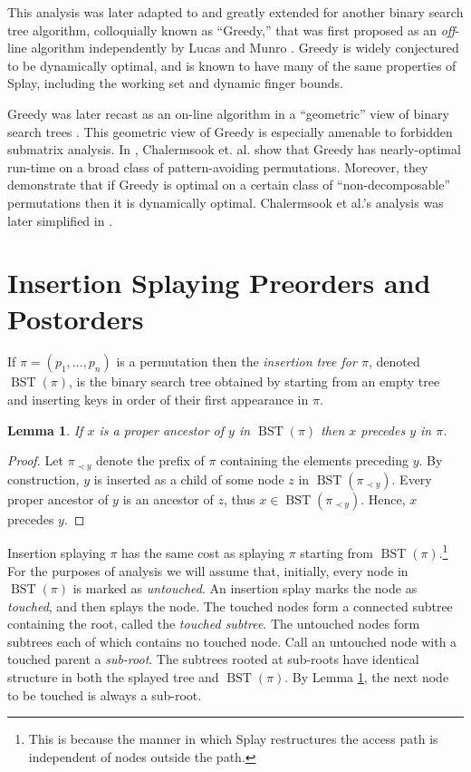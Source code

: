 \documentclass{article}
\theoremstyle{plain}
\newtheorem{lemma}{Lemma}
\theoremstyle{definition}
\DeclareMathOperator{\BST}{BST}  %
\begin{document}
%
This analysis was later adapted to and greatly extended for another binary
search tree algorithm, colloquially known as ``Greedy,'' that was first
proposed as an \emph{off}-line algorithm independently by Lucas
\cite{CANONICAL_FORMS} and Munro \cite{MUNRO_GREEDY}. Greedy is widely
conjectured to be dynamically optimal, and is known to have many of the same
properties of Splay, including the working set \cite{GREEDY_ACCESS_LEMMA} and
dynamic finger \cite{GREEDY_DYNAMIC_FINGER} bounds.

%
Greedy was later recast as an on-line algorithm in a ``geometric'' view of
binary search trees \cite{GEOMETRY}. This geometric view of Greedy is
especially amenable to forbidden submatrix analysis. In
\cite{PATTERN_AVOIDANCE}, Chalermsook et. al. show that Greedy has
nearly-optimal run-time on a broad class of pattern-avoiding permutations.
Moreover, they demonstrate that if Greedy is optimal on a certain class of
``non-decomposable'' permutations then it is dynamically optimal. Chalermsook
et al.'s analysis was later simplified in \cite{SIMPLER_PATTERN_AVOIDANCE}.


\section{Insertion Splaying Preorders and Postorders}\label{sec:MainResults}


%
If $\pi=(p_1,\dots,p_n)$ is a permutation then the \emph{insertion tree for
$\pi$}, denoted $\BST(\pi)$, is the binary search tree obtained by starting
from an empty tree and inserting keys in order of their first appearance in
$\pi$.
%
\begin{lemma}\label{lem:AncestorPrecedence}
If $x$ is a proper ancestor of $y$ in $\BST(\pi)$ then $x$ precedes $y$ in
$\pi$.
\end{lemma}

\begin{proof}
Let $\pi_{\prec y}$ denote the prefix of $\pi$ containing the elements preceding
$y$. By construction, $y$ is inserted as a child of some node $z$ in
$\BST(\pi_{\prec y})$. Every proper ancestor of $y$ is an ancestor of
$z$, thus $x\in\BST(\pi_{\prec y})$. Hence, $x$ precedes $y$.
\end{proof}

%
Insertion splaying $\pi$ has the same cost as splaying $\pi$ starting from
$\BST(\pi)$.\footnote{This is because the manner in which Splay restructures
the access path is independent of nodes outside the path.} For the purposes of
analysis we will assume that, initially, every node in $\BST(\pi)$ is marked as
\emph{untouched}. An insertion splay marks the node as \emph{touched}, and then
splays the node. The touched nodes form a connected subtree containing the
root, called the \emph{touched subtree}. The untouched nodes form subtrees each
of which contains no touched node. Call an untouched node with a touched parent
a \emph{sub-root}. The subtrees rooted at sub-roots have identical structure in
both the splayed tree and $\BST(\pi)$. By Lemma \ref{lem:AncestorPrecedence},
the next node to be touched is always a sub-root.
\end{document}
